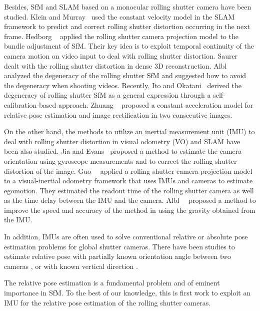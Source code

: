 \documentclass[10pt,twocolumn,letterpaper]{article}
\theoremstyle{definition}
\begin{document}
	
	
	Besides, SfM and SLAM based on a monocular rolling shutter camera have been studied.
	Klein and Murray~\cite{Klein:ISMAR:2009} used the constant velocity model in the SLAM framework to predict and correct rolling shutter distortion occurring in the next frame.
	Hedborg \etal~\cite{Hedborg:ICCVW:2011,Hedborg:CVPR:2012} applied the rolling shutter camera projection model to the bundle adjustment of SfM.
	Their key idea is to exploit temporal continuity of the camera motion on video input to deal with rolling shutter distortion.
	Saurer \etal~\cite{Saurer:ICCV:2013} dealt with the rolling shutter distortion in dense 3D reconstruction.
	Albl \etal~\cite{Albl:ECCV:2016} analyzed the degeneracy of the rolling shutter SfM and suggested how to avoid the degeneracy when shooting videos.
	Recently, Ito and Okatani~\cite{Ito:CVPR:2017} derived the degeneracy of rolling shutter SfM as a general expression through a self-calibration-based approach.
	Zhuang \etal~\cite{Zhuang:ICCV:2017} proposed a constant acceleration model for relative pose estimation and image rectification in two consecutive images.
	
	
	On the other hand, the methods to utilize an inertial measurement unit (IMU) to deal with rolling shutter distortion in visual odometry (VO) and SLAM have been also studied.
	Jia and Evans~\cite{Jia:MMSP:2012} proposed a method to estimate the camera orientation using gyroscope measurements and to correct the rolling shutter distortion of the image.
	Guo~\etal~\cite{Guo:RSS:2014} applied a rolling shutter camera projection model to a visual-inertial odometry framework that uses IMUs and cameras to estimate egomotion.
	They estimated the readout time of the rolling shutter camera as well as the time delay between the IMU and the camera.
	Albl~\etal~\cite{Albl:CVPR:2016} proposed a method to improve the speed and accuracy of the method in \cite{Albl:CVPR:2015} using the gravity obtained from the IMU.
	
	
	
	In addition, IMUs are often used to solve conventional relative or absolute pose estimation problems for global shutter cameras.
	There have been studies to estimate relative pose with partially known orientation angle between two cameras \cite{Fraundorfer:ECCV:2010,Li:IROS:2013}, or with known vertical direction \cite{Kukelova:ACCV:2011,Lee:CVPR:2014}.
	

	The relative pose estimation is a fundamental problem and of eminent importance in SfM.
	To the best of our knowledge, this is first work to exploit an IMU for the relative pose estimation of the rolling shutter cameras.
	
\end{document}

